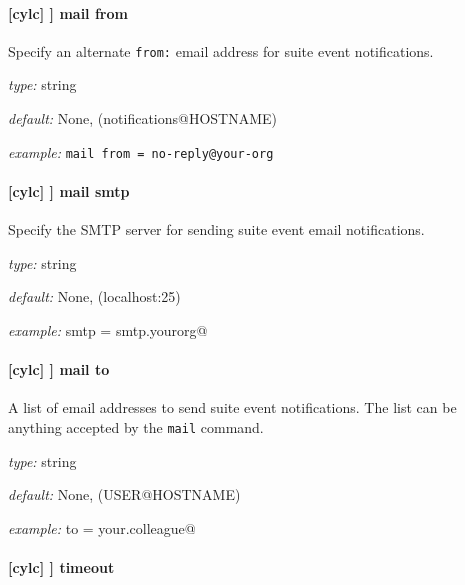 \paragraph[mail from]{[cylc] \textrightarrow [[events]] \textrightarrow mail from}

Specify an alternate \lstinline=from:= email address for suite event notifications.

\begin{myitemize}
    \item {\em type:} string
    \item {\em default:} None, (notifications@HOSTNAME)
    \item {\em example:} \lstinline|mail from = no-reply@your-org|
\end{myitemize}

\paragraph[mail smtp]{[cylc] \textrightarrow [[events]] \textrightarrow mail smtp}

Specify the SMTP server for sending suite event email notifications.

\begin{myitemize}
    \item {\em type:} string
    \item {\em default:} None, (localhost:25)
    \item {\em example:} \lstinline@mail smtp = smtp.yourorg@
\end{myitemize}

\paragraph[mail to]{[cylc] \textrightarrow [[events]] \textrightarrow mail to}

A list of email addresses to send suite event notifications. The list can be
anything accepted by the \lstinline=mail= command.

\begin{myitemize}
    \item {\em type:} string
    \item {\em default:} None, (USER@HOSTNAME)
    \item {\em example:} \lstinline@mail to = your.colleague@
\end{myitemize}

\paragraph[timeout]{[cylc] \textrightarrow [[events]] \textrightarrow timeout}

